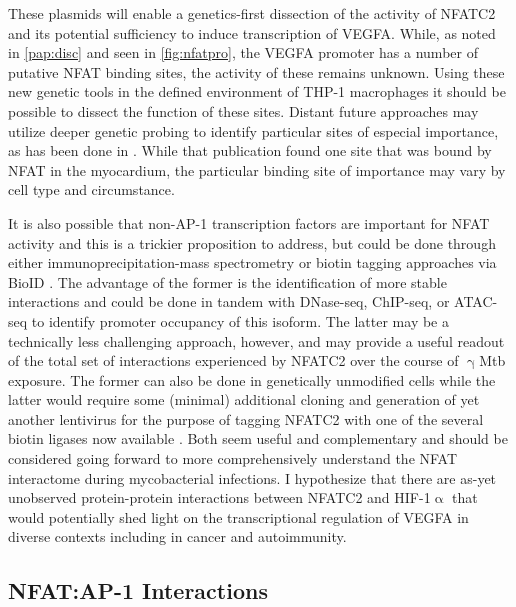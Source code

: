\doublespacing

These plasmids will enable a genetics-first dissection of the activity of NFATC2 and its potential sufficiency to induce transcription of VEGFA. While, as noted in \autoref{pap:disc} and seen in \autoref{fig:nfatpro}, the VEGFA promoter has a number of putative NFAT binding sites, the activity of these remains unknown. Using these new genetic tools in the defined environment of THP-1 macrophages it should be possible to dissect the function of these sites. Distant future approaches may utilize deeper genetic probing to identify particular sites of especial importance, as has been done in \citet{Chang2004}. While that publication found one site that was bound by NFAT in the myocardium, the particular binding site of importance may vary by cell type and circumstance. 

It is also possible that non-AP-1 transcription factors are important for NFAT activity and this is a trickier proposition to address, but could be done through either immunoprecipitation-mass spectrometry or biotin tagging approaches via BioID \citep{Roux2012}. The advantage of the former is the identification of more stable interactions and could be done in tandem with DNase-seq, ChIP-seq, or ATAC-seq to identify promoter occupancy of this isoform. The latter may be a technically less challenging approach, however, and may provide a useful readout of the total set of interactions experienced by NFATC2 over the course of $\upgamma$Mtb exposure. The former can also be done in genetically unmodified cells while the latter would require some (minimal) additional cloning and generation of yet another lentivirus for the purpose of tagging NFATC2 with one of the several biotin ligases now available \citep{Cho2020}. Both seem useful and complementary and should be considered going forward to more comprehensively understand the NFAT interactome during mycobacterial infections. I hypothesize that there are as-yet unobserved protein-protein interactions between NFATC2 and HIF-1$\upalpha$ that would potentially shed light on the transcriptional regulation of VEGFA in diverse contexts including in cancer and autoimmunity. 

\subsection{NFAT:AP-1 Interactions}

